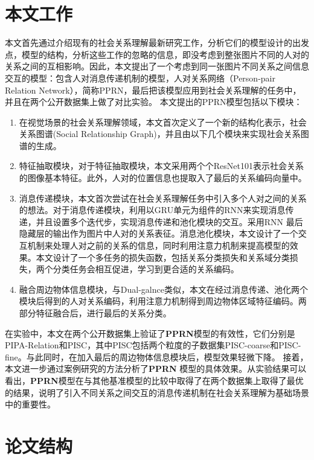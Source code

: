 \section{本文工作}

本文首先通过介绍现有的社会关系理解最新研究工作，分析它们的模型设计的出发点，模型的结构，分析这些工作的忽略的信息，即没考虑到整张图片不同的人对的关系之间的互相影响。因此，本文提出了一个考虑到同一张图片不同关系之间信息交互的模型：包含人对消息传递机制的模型，人对关系网络（Person-pair Relation Network），简称PPRN，最后把该模型应用到社会关系理解的任务中，并且在两个公开数据集上做了对比实验。
本文提出的PPRN模型包括以下模块：
\begin{enumerate}
    \item 在视觉场景的社会关系理解领域，本文首次定义了一个新的结构化表示，社会关系图谱(Social Relationship Graph)，并且由以下几个模块来实现社会关系图谱的生成。
    \item 特征抽取模块，对于特征抽取模块，本文采用两个个ResNet101\cite{he2016deep}表示社会关系的图像基本特征。此外，人对的位置信息也提取入了最后的关系编码向量中。
    \item 消息传递模块，本文首次尝试在社会关系理解任务中引入多个人对之间的关系的想法。对于消息传递模块，利用以GRU单元为组件的RNN来实现消息传递，并且设置多个迭代步，实现消息传递和池化模块的交互。采用RNN 最后隐藏层的输出作为图片中人对的关系表征。消息池化模块，本文设计了一个交互机制来处理人对之前的关系的信息，同时利用注意力机制来提高模型的效果。本文设计了一个多任务的损失函数，包括关系分类损失和关系域分类损失，两个分类任务会相互促进，学习到更合适的关系编码。
    \item 融合周边物体信息模块，与Dual-galnce\cite{li2017dual-glance}类似，本文在经过消息传递、池化两个模块后得到的人对关系编码，利用注意力机制得到周边物体区域特征编码。两部分特征融合后，进行最后的关系分类。
\end{enumerate}
在实验中，本文在两个公开数据集上验证了\textbf{PPRN}模型的有效性，它们分别是PIPA-Relation和PISC，其中PISC包括两个粒度的子数据集PISC-coarse和PISC-fine。与此同时，在加入最后的周边物体信息模块后，模型效果轻微下降。
接着，本文进一步通过案例研究的方法分析了\textbf{PPRN} 模型的具体效果。从实验结果可以看出，\textbf{PPRN}模型在与其他基准模型的比较中取得了在两个数据集上取得了最优的结果，说明了引入不同关系之间交互的消息传递机制在社会关系理解为基础场景中的重要性。

\section{论文结构}


